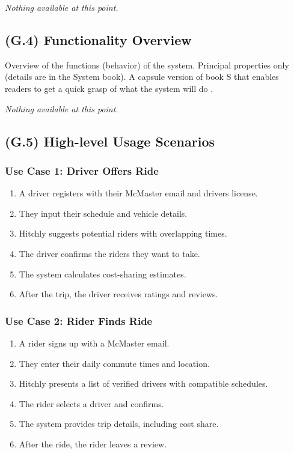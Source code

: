 \documentclass[12pt,letterpaper]{article}
\begin{document}
\textit{Nothing available at this point.}

\subsection{(G.4) Functionality Overview}
Overview of the functions (behavior) of the system. Principal properties only (details are in the System book). A capsule version of book S that enables readers to get a quick grasp of what the system will do \cite{meyer2022}.

\textit{Nothing available at this point.}

\subsection{(G.5) High-level Usage Scenarios}

\subsubsection*{Use Case 1: Driver Offers Ride}
\begin{enumerate}
    \item A driver registers with their McMaster email and drivers license.
    \item They input their schedule and vehicle details.
    \item Hitchly suggests potential riders with overlapping times.
    \item The driver confirms the riders they want to take.
    \item The system calculates cost-sharing estimates.
    \item After the trip, the driver receives ratings and reviews.
\end{enumerate}

\subsubsection*{Use Case 2: Rider Finds Ride}
\begin{enumerate}
    \item A rider signs up with a McMaster email.
    \item They enter their daily commute times and location.
    \item Hitchly presents a list of verified drivers with compatible schedules.
    \item The rider selects a driver and confirms.
    \item The system provides trip details, including cost share.
    \item After the ride, the rider leaves a review.
\end{enumerate}
\end{document}
